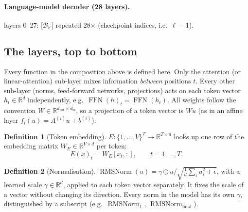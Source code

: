 \documentclass[10pt,a4paper]{article}
\newcommand{\op}[1]{\operatorname{#1}}
\theoremstyle{definition}
\newtheorem{definition}{Definition}[section]
\begin{document}
\paragraph{Language-model decoder (28 layers).} 
layers 0--27: [$\mathcal{B}_{\mathrm{F}}$] repeated 28$\times$ (checkpoint indices, i.e.\ $\ell-1$).
\subsection{The layers, top to bottom}\label{sec:layers}
Every function in the composition above is defined here. Only the attention (or linear-attention) sub-layer mixes information \emph{between} positions $t$. Every other sub-layer (norms, feed-forward networks, projections) acts on each token vector $h_t\in\mathbb{R}^{d}$ independently, e.g.\ $\op{FFN}(h)_t=\op{FFN}(h_t)$. All weights follow the convention $W\in\mathbb{R}^{d_{\mathrm{out}}\times d_{\mathrm{in}}}$, so a projection of a token vector is $W u$ (as in an affine layer $f_i(u)=A^{(i)}u+b^{(i)}$).
\begin{definition}[Token embedding]\label{def:embed}
$E:\{1,\dots,V\}^{T}\to\mathbb{R}^{T\times d}$ looks up one row of the embedding matrix $W_E\in\mathbb{R}^{V\times d}$ per token:
\begin{equation}
  E(x)_t = W_E[x_t,:],\qquad t=1,\dots,T.
\end{equation}
\end{definition}
\begin{definition}[Normalisation]
$\op{RMSNorm}(u)=\gamma\odot u/\sqrt{\tfrac1d\sum_i u_i^2+\epsilon}$, with a learned scale $\gamma\in\mathbb{R}^{d}$, applied to each token vector separately. It fixes the scale of a vector without changing its direction. Every norm in the model has its own $\gamma$, distinguished by a subscript (e.g.\ $\op{RMSNorm}_1$, $\op{RMSNorm}_{\mathrm{final}}$).
\end{definition}
\end{document}

